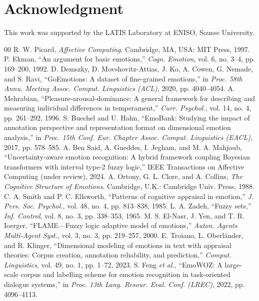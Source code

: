 \documentclass[conference, a4paper]{IEEEtran}
\begin{document}
\section*{Acknowledgment}
This work was supported by the LATIS Laboratory at ENISO, Sousse University.

\begin{thebibliography}{00}
 R. W. Picard, \textit{Affective Computing}. Cambridge, MA, USA: MIT Press, 1997.
 P. Ekman, ``An argument for basic emotions,'' \textit{Cogn. Emotion}, vol. 6, no. 3--4, pp. 169--200, 1992.
 D. Demszky, D. Movshovitz-Attias, J. Ko, A. Cowen, G. Nemade, and S. Ravi, ``GoEmotions: A dataset of fine-grained emotions,'' in \textit{Proc. 58th Annu. Meeting Assoc. Comput. Linguistics (ACL)}, 2020, pp. 4040--4054.
 A. Mehrabian, ``Pleasure-arousal-dominance: A general framework for describing and measuring individual differences in temperament,'' \textit{Curr. Psychol.}, vol. 14, no. 4, pp. 261--292, 1996.
 S. Buechel and U. Hahn, ``EmoBank: Studying the impact of annotation perspective and representation format on dimensional emotion analysis,'' in \textit{Proc. 15th Conf. Eur. Chapter Assoc. Comput. Linguistics (EACL)}, 2017, pp. 578--585.
 A. Ben Said, A. Gueddes, I. Jegham, and M. A. Mahjoub, ``Uncertainty-aware emotion recognition: A hybrid framework coupling Bayesian transformers with interval type-2 fuzzy logic,'' IEEE Transactions on Affective Computing (under review), 2024.
 A. Ortony, G. L. Clore, and A. Collins, \textit{The Cognitive Structure of Emotions}. Cambridge, U.K.: Cambridge Univ. Press, 1988.
 C. A. Smith and P. C. Ellsworth, ``Patterns of cognitive appraisal in emotion,'' \textit{J. Pers. Soc. Psychol.}, vol. 48, no. 4, pp. 813--838, 1985.
 L. A. Zadeh, ``Fuzzy sets,'' \textit{Inf. Control}, vol. 8, no. 3, pp. 338--353, 1965.
 M. S. El-Nasr, J. Yen, and T. R. Ioerger, ``FLAME---Fuzzy logic adaptive model of emotions,'' \textit{Auton. Agents Multi-Agent Syst.}, vol. 3, no. 3, pp. 219--257, 2000.
 E. Troiano, L. Oberl\"{a}nder, and R. Klinger, ``Dimensional modeling of emotions in text with appraisal theories: Corpus creation, annotation reliability, and prediction,'' \textit{Comput. Linguistics}, vol. 49, no. 1, pp. 1--72, 2023.
 S. Feng \textit{et al.}, ``EmoWOZ: A large-scale corpus and labelling scheme for emotion recognition in task-oriented dialogue systems,'' in \textit{Proc. 13th Lang. Resour. Eval. Conf. (LREC)}, 2022, pp. 4096--4113.

\end{thebibliography}
\end{document}
